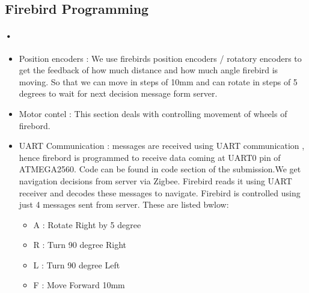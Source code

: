 \documentclass[]{exam}
\begin{document}
  \subsection{\color{red} Firebird Programming }
  
  \paragraph{•}
  
  
  
  
  \begin{itemize}
  \item Position encoders : We use firebirds position encoders / rotatory encoders to get the feedback of how much distance and how much angle firebird is moving. So that we can move in steps of 10mm and can rotate in steps of 5 degrees to wait for next decision message form server. 
  
  \item Motor contel : This section deals with controlling movement of wheels of firebord.
  
  \item UART Communication :  messages are received using UART communication , hence firebord is programmed to receive data coming at UART0 pin of ATMEGA2560. Code can be found in code section of the submission.We get navigation decisions from server via Zigbee. Firebird reads it using UART receiver and decodes these messages to navigate. Firebird is controlled using just 4 messages sent from server. These are listed bwlow: 
  \begin{itemize}
  \item A  : Rotate Right by 5 degree 
  \item R : Turn 90 degree Right 
  \item L : Turn 90 degree Left 
  \item F : Move Forward 10mm 
  \end{itemize} 
  \end{itemize}
  
  
\end{document}
